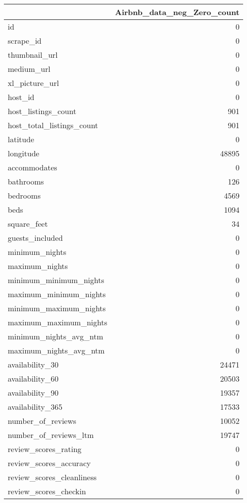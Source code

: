 \documentclass[
]{article}
\begin{document}
\begin{table}[H]
\centering
\begin{tabular}{l|r}
\hline
  & Airbnb\_data\_neg\_Zero\_count\\
\hline
id & 0\\
\hline
scrape\_id & 0\\
\hline
thumbnail\_url & 0\\
\hline
medium\_url & 0\\
\hline
xl\_picture\_url & 0\\
\hline
host\_id & 0\\
\hline
host\_listings\_count & 901\\
\hline
host\_total\_listings\_count & 901\\
\hline
latitude & 0\\
\hline
longitude & 48895\\
\hline
accommodates & 0\\
\hline
bathrooms & 126\\
\hline
bedrooms & 4569\\
\hline
beds & 1094\\
\hline
square\_feet & 34\\
\hline
guests\_included & 0\\
\hline
minimum\_nights & 0\\
\hline
maximum\_nights & 0\\
\hline
minimum\_minimum\_nights & 0\\
\hline
maximum\_minimum\_nights & 0\\
\hline
minimum\_maximum\_nights & 0\\
\hline
maximum\_maximum\_nights & 0\\
\hline
minimum\_nights\_avg\_ntm & 0\\
\hline
maximum\_nights\_avg\_ntm & 0\\
\hline
availability\_30 & 24471\\
\hline
availability\_60 & 20503\\
\hline
availability\_90 & 19357\\
\hline
availability\_365 & 17533\\
\hline
number\_of\_reviews & 10052\\
\hline
number\_of\_reviews\_ltm & 19747\\
\hline
review\_scores\_rating & 0\\
\hline
review\_scores\_accuracy & 0\\
\hline
review\_scores\_cleanliness & 0\\
\hline
review\_scores\_checkin & 0\\

\end{tabular}
\end{table}
\end{document}
